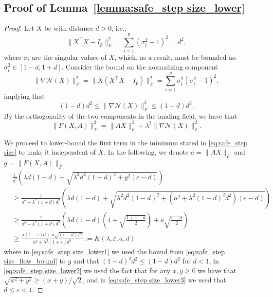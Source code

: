 \documentclass[twoside,11pt]{article}
\newcommand{\cN}{\mathcal{N}} %
\newcommand{\revision}[1]{{#1}}
\newcommand{\finalrevision}[1]{{#1}}
\begin{document}
\subsection{Proof of Lemma~\ref{lemma:safe_step size_lower}}
\label{app:proof:safe_step}
\begin{proof}
    Let $X$ be with distance $d>0$, i.e.,
    \begin{equation*}
        \| X^\top X - I_p\|^2_F  = \sum_{i=1}^{p} (\sigma_i^2 - 1)^2 = d^2,
    \end{equation*}
    where $\sigma_i$ are the singular values of $X$, which, as a result, must be bounded as: $\sigma_i^2 \in [1-d, 1+d]$.
    Consider the bound on the normalizing component
    \begin{equation*}
        \| \nabla \cN(X) \|_F^2 = \| X (X^\top X - I_p)\|^2_F = \sum_{i=1}^p \sigma_i^2 (\sigma_i^2-1)^2,
    \end{equation*}
    implying that
    \begin{equation*}
        (1-d)d^2 \leq \| \nabla \cN(X) \|_F^2 \leq (1+d)d^2.
    \end{equation*}
    By the orthogonality of the two components in the landing field, we have that
    \begin{equation}
        \| \revision{F(X, A)} \|_F^2 = \|AX\|^2_F + \lambda^2 \| \nabla \cN(X)\|_F^2. \label{eq:safe_step size_flow_bound}
    \end{equation}

    We proceed to lower-bound the first term in the minimum stated in \eqref{eq:safe_step size} to make it independent of $X$. In the following, we denote $a = \|AX\|_F$ and $g = \| F(X, A) \|_F$
    \begin{align}
        &\frac{1}{g^2}\left( \lambda d (1-d) + \sqrt{\lambda^2 d^2 (1-d)^2 + g^2 (\varepsilon - d)}\right) \\
        &\geq \frac{1}{a^2 + \lambda^2 (1+d)d^2}\left(  \lambda d (1-d) + \sqrt{\lambda^2 d^2 (1-d)^2 + (a^2 + \lambda^2(1-d)^2 d^2) (\varepsilon - d)} \right) \label{eq:safe_step size_lower1} \\
        &\geq \frac{1}{a^2 + \lambda^2 (1+d)d^2}\left( \lambda d (1-d)\left(1 + \sqrt{\frac{1+\varepsilon-d}{2}}\right) + a\sqrt{\frac{\varepsilon - d}{2}}\right) \label{eq:safe_step size_lower2}\\
        &\geq \frac{\lambda (1-\varepsilon) d  + a\sqrt{(\varepsilon - d)/2}}{a^2 + \lambda^2 (1+\varepsilon)d^2} \finalrevision{:=K(\lambda, \varepsilon, a, d)} \label{eq:safe_step size_lower3}
    \end{align}
    where in \eqref{eq:safe_step size_lower1} we used the bound from \eqref{eq:safe_step size_flow_bound} to $g$ and that $(1-d)^2d^2 \leq (1-d)d^2$ for $d<1$, in \eqref{eq:safe_step size_lower2} we used the fact that for any $x,y \geq 0$ we have that $\sqrt{x^2 + y^2} \geq (x+y)/\sqrt{2}$, and in \eqref{eq:safe_step size_lower3} we used that $d \leq \varepsilon <1$.


\end{proof}
\end{document}
